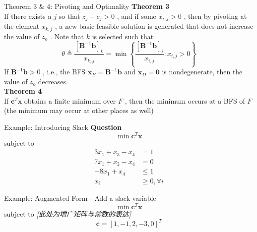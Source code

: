 \documentclass[aspectratio=169,hyperref,UTF8,CJK]{beamer}
\begin{document}
\begin{frame}{Theorem 3 \& 4: Pivoting and Optimality}
\textbf{Theorem 3} \\
If there exists a \(j\) so that \(z_{j} - c_{j} > 0\) , and if some \(x_{i,j} > 0\) , then by pivoting at the element \(x_{k,j}\) , a new basic feasible solution is generated that does not increase the value of \(z_{o}\) . Note that \(k\) is selected such that
\[
\theta \triangleq \frac{[\mathbf{B}^{-1}\mathbf{b}]_{k}}{x_{k,j}} = \min \left\{\frac{[\mathbf{B}^{-1}\mathbf{b}]_{i}}{x_{i,j}}:x_{i,j} > 0\right\}
\]
If \(\mathbf{B}^{- 1}\mathbf{b} > 0\) , i.e., the BFS \(\mathbf{x}_{B} = \mathbf{B}^{- 1}\mathbf{b}\) and \(\mathbf{x}_{D} = \mathbf{0}\) is nondegenerate, then the value of \(z_{o}\) decreases. \\
\textbf{Theorem 4} \\
If \(\mathbf{c}^{T}\mathbf{x}\) obtains a finite minimum over \(F\) , then the minimum occurs at a BFS of \(F\) (the minimum may occur at other places as well)
\end{frame}

\begin{frame}{Example: Introducing Slack}
\textbf{Question} \\
\[
\min \mathbf{c}^T\mathbf{x}
\]
subject to
\begin{align*}
3x_1 + x_3 - x_4 &= 1 \\
7x_1 + x_2 - x_4 &= 0 \\
-8x_1 + x_4 &\leq 1 \\
x_i &\geq 0, \forall i
\end{align*}
\end{frame}

\begin{frame}{Example: Augmented Form}
- Add a slack variable
\[
\min \mathbf{c}^T\mathbf{x}
\]
subject to
\textit{[此处为增广矩阵与常数的表达]}
\[
\mathbf{c} = [1, - 1, 2, - 3, 0]^T
\]
\end{frame}
\end{document}
